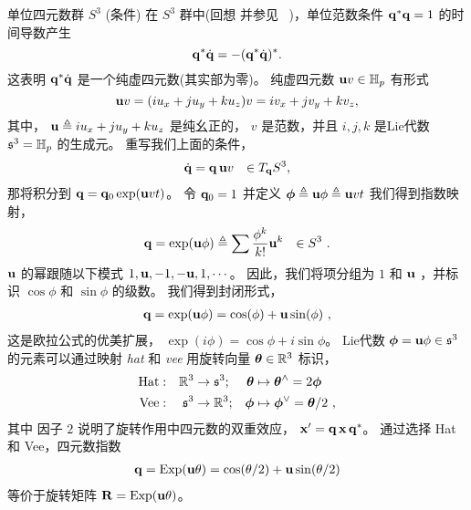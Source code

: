 
\begin{fexample}{单位四元数群 $S^3$ (条件)}
\label{ex:S3}
在 $S^3$ 群中(回想  并参见 \eg\ \cite{SOLA-17-Quaternion})，单位范数条件 ${\bf q}^*{\bf q}=1$ 的时间导数产生 
%
$${\bf q}^*\dot{{\bf q}}=-({\bf q}^*\dot{{\bf q}})^*
.
$$
%
这表明 ${\bf q}^*\dot{{\bf q}}$ 是一个纯虚四元数(其实部为零)。
纯虚四元数 ${\bf u} v\in{\mathbb H}_p$ 有形式 
%
$${\bf u} v=(iu_x+ju_y+ku_z)v =iv_x+jv_y+kv_z 
,$$
%
其中， ${\bf u}\triangleq iu_x+ju_y+ku_z$ 是纯幺正的， $v$ 是范数，并且 $i,j,k$ 是Lie代数 $\frak{s}^3={\mathbb H}_p$ 的生成元。
%
重写我们上面的条件，
%
\begin{align*}
\dot{{\bf q}}={\bf q}\, {\bf u} v &&\in T_{{\bf q}}{S^3}
,
\end{align*}
% 
那将积分到 ${\bf q} = {\bf q}_0\exp({\bf u} v t)$。 
令 ${\bf q}_0=1$ 并定义 ${{\bm \phi}} \triangleq {\bf u}\phi \triangleq{\bf u} v t$ 我们得到指数映射，
%
\begin{align*}
{\bf q} = \exp({\bf u}\phi) \triangleq \sum \frac{\phi^k}{k!}{\bf u}^k &&\in S^3
~.
\end{align*}
%
${\bf u}$ 的幂跟随以下模式 $1,{\bf u},-1,-{\bf u},1,\cdots$。
因此，我们将项分组为 $1$ 和 ${\bf u}$ ，并标识 $\cos\phi$ 和 $\sin\phi$ 的级数。
我们得到封闭形式，
%
\begin{align*}
{\bf q} = \exp({\bf u}\phi) = \cos(\phi) + {\bf u}\sin(\phi) 
~,
\end{align*}
%
这是欧拉公式的优美扩展， $\exp(i\phi)=\cos\phi+i\sin\phi$。
%
Lie代数 ${\bm \phi}={\bf u} \phi\in\frak{s}^3$ 的元素可以通过映射 \emph{hat} 和 \emph{vee} 用旋转向量 ${{\bm \theta}}\in{\mathbb R}^3$ 标识，
%
\begin{align*}
\textrm{Hat}&:& {\mathbb R}^3&\to\frak{s}^3;& {{\bm \theta}}&\mapsto{{\bm \theta}}^\wedge=2{{\bm \phi}}
\\
\textrm{Vee}&:& \frak{s}^3&\to{\mathbb R}^3;& {{\bm \phi}}&\mapsto{{\bm \phi}}^\vee={{\bm \theta}}/2
~,
\end{align*}
%
其中 %
因子 $2$ 说明了旋转作用中四元数的双重效应， ${\bf x}'={\bf q}\,{\bf x}\,{\bf q}^*$。 
%
通过选择 Hat 和 Vee，四元数指数
%
\begin{align*}
{\bf q} = \operatorname*{Exp}({\bf u}\theta)=\cos(\theta/2)+{\bf u}\sin(\theta/2)
\end{align*}
%
等价于旋转矩阵 ${\bf R}=\operatorname*{Exp}({\bf u}\theta)$。
\end{fexample}
